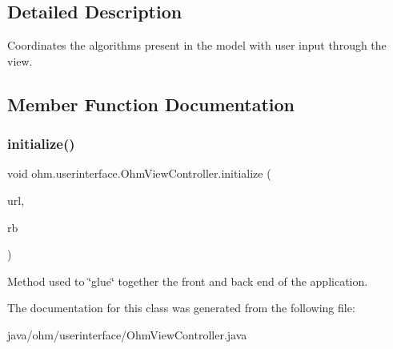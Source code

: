 \subsection{Detailed Description}
Coordinates the algorithms present in the model with user input through the view. 

\subsection{Member Function Documentation}
\hypertarget{classohm_1_1userinterface_1_1_ohm_view_controller_aa1653060f9f810ea5cd6a0f917b02521}{}\label{classohm_1_1userinterface_1_1_ohm_view_controller_aa1653060f9f810ea5cd6a0f917b02521} 
\subsubsection{\texorpdfstring{initialize()}{initialize()}}
{\footnotesize\ttfamily void ohm.\+userinterface.\+Ohm\+View\+Controller.\+initialize (\begin{DoxyParamCaption}\item[{U\+RL}]{url,  }\item[{Resource\+Bundle}]{rb }\end{DoxyParamCaption})}

Method used to \char`\"{}glue\char`\"{} together the front and back end of the application. 

The documentation for this class was generated from the following file\+:\begin{DoxyCompactItemize}
\item 
java/ohm/userinterface/Ohm\+View\+Controller.\+java\end{DoxyCompactItemize}
